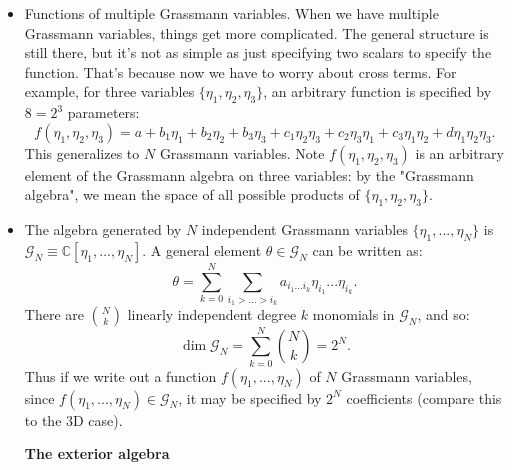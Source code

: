 \documentclass[12pt, oneside]{article}   	%
\theoremstyle{definition}
\begin{document}
\begin{itemize}
	\item Functions of multiple Grassmann variables. When we have multiple Grassmann variables, things get more complicated. The general structure is still there, but it's not as simple as just specifying two scalars to specify the function. That's because now we have to worry about cross terms. For example, for three variables $\{\eta_1, \eta_2, \eta_3\}$, an arbitrary function is specified by $8 = 2^3$ parameters:
	\begin{equation}
		f(\eta_1, \eta_2, \eta_3) = a + b_1 \eta_1 + b_2 \eta_2 + b_3 \eta_3 + c_1 \eta_2\eta_3 + c_2\eta_3\eta_1 + c_3\eta_1\eta_2 + d\eta_1\eta_2\eta_3.
	\end{equation}
	This generalizes to $N$ Grassmann variables. Note $f(\eta_1, \eta_2, \eta_3)$ is an arbitrary element of the Grassmann algebra on three variables: by the "Grassmann algebra", we mean the space of all possible products of $\{\eta_1, \eta_2, \eta_3\}$. 
	
	\item The algebra generated by $N$ independent Grassmann variables $\{\eta_1, ..., \eta_N\}$ is $\mathcal G_N\equiv 
	\mathbb C[\eta_1, ..., \eta_N]$. A general element $\theta\in\mathcal G_N$ can be written as:
	\begin{equation}
		\theta = \sum_{k = 0}^N \sum_{i_1 > ... > i_k} a_{i_1 ... i_k} \eta_{i_1} ... \eta_{i_k}.
	\end{equation}
	There are $\binom{N}{k}$ linearly independent degree $k$ monomials in $\mathcal G_N$, and so:
	\begin{equation}
		\dim\mathcal G_N = \sum_{k = 0}^N \binom{N}{k} = 2^N.
	\end{equation}
	Thus if we write out a function $f(\eta_1, ..., \eta_N)$ of $N$ Grassmann variables, since $f(\eta_1, ..., \eta_N)\in\mathcal G_N$, it may be specified by $2^N$ coefficients (compare this to the 3D case).
	
	\begin{answerbox}
	{\centering \textbf{The exterior algebra}} \\
	

\end{answerbox}
\end{itemize}
\end{document}
